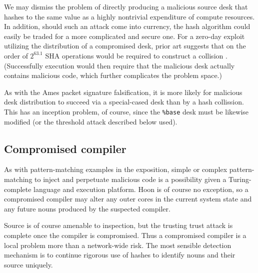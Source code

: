 \documentclass[twoside]{article}
\begin{document}
We may dismiss the problem of directly producing a malicious source desk that hashes to the same value as a highly nontrivial expenditure of compute resources.  In addition, should such an attack come into currency, the hash algorithm could easily be traded for a more complicated and secure one.  For a zero-day exploit utilizing the distribution of a compromised desk, prior art suggests that on the order of $2^{63.1}$ SHA operations would be required to construct a collision \citep{Stevens2017}.  (Successfully execution would then require that the malicious desk actually contains malicious code, which further complicates the problem space.)

As with the Ames packet signature falsification, it is more likely for malicious desk distribution to succeed via a special-cased desk than by a hash collission.  This has an inception problem, of course, since the \lstinline[style=inlinecode]{%base} desk must be likewise modified (or the threshold attack described below used).


\subsection{Compromised compiler}

As with pattern-matching examples in the exposition, simple or complex pattern-matching to inject and perpetuate malicious code is a possibility given a Turing-complete language and execution platform.  Hoon is of course no exception, so a compromised compiler may alter any outer cores in the current system state and any future nouns produced by the suspected compiler.

Source is of course amenable to inspection, but the trusting trust attack is complete once the compiler is compromised.  Thus a compromised compiler is a local problem more than a network-wide risk.  The most sensible detection mechanism is to continue rigorous use of hashes to identify nouns and their source uniquely.
\end{document}
